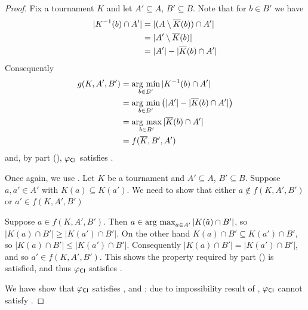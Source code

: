 \begin{proof}
     Fix a tournament $K$ and let $A' \subseteq A$, $B'
    \subseteq B$. Note that for $b \in B'$ we have
    \begin{align*}
        |K^{-1}(b) \cap A'|
        &= |(A \setminus {\overline{K}}(b)) \cap A'| \\
        &= |A' \setminus {\overline{K}}(b)| \\
        &= |A'| - |{\overline{K}}(b) \cap A'|
    \end{align*}
    Consequently
    \begin{align*}
        g(K, A', B')
        &= \operatorname*{arg\ min}_{b \in B'}{|K^{-1}(b) \cap A'|} \\
        &= \operatorname*{arg\ min}_{b \in B'}{\left(|A'| - |{\overline{K}}(b) \cap A'|\right)} \\
        &= \operatorname*{arg\ max}_{b \in B'}{|{\overline{K}}(b) \cap A'|} \\
        &= f({\overline{K}}, B', A')
    \end{align*}
    and, by  part
    (), ${\varphi_{\mathsf{CI}}}$ satisfies .

     Once again, we use
    .  Let $K$ be a tournament and $A'
    \subseteq A$, $B' \subseteq B$. Suppose $a, a' \in A'$ with $K(a) \subseteq
    K(a')$. We need to show that either $a \not\in f(K, A', B')$ or $a' \in
    f(K, A', B')$

    Suppose $a \in f(K, A', B')$. Then $a \in \operatorname*{arg\ max}_{\hat{a} \in
    A'}{|K(\hat{a}) \cap B'|}$, so $|K(a) \cap B'| \ge |K(a') \cap B'|$. On the
    other hand $K(a) \cap B' \subseteq K(a') \cap B'$, so $|K(a) \cap B'| \le
    |K(a') \cap B'|$.  Consequently $|K(a) \cap B'| = |K(a') \cap B'|$, and so
    $a' \in f(K, A', B')$. This shows the property required by
     part
    () is satisfied, and thus ${\varphi_{\mathsf{CI}}}$
    satisfies .

     We have show that ${\varphi_{\mathsf{CI}}}$ satisfies
    ,  and ; due to
    impossibility result of , ${\varphi_{\mathsf{CI}}}$
    cannot satisfy .


\end{proof}
